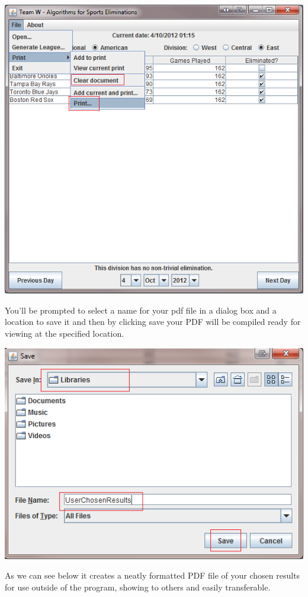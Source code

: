 \includegraphics[width=\linewidth,keepaspectratio]{images/userManualDesk13.png}

You'll be prompted to select a name for your pdf file in a dialog box and a location to save it and then by clicking save your PDF will be compiled ready for viewing at the specified location.

\includegraphics[width=\linewidth,keepaspectratio]{images/userManualDesk14.png}

As we can see below it creates a neatly formatted PDF file of your chosen results for use outside of the program, showing to others and easily transferable.


